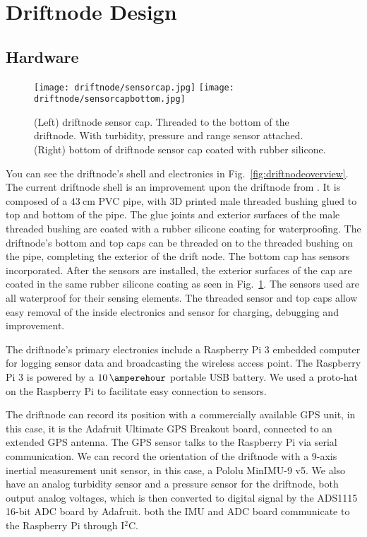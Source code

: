 \section[Design]{Driftnode Design}

\subsection[Hardware]{Hardware}

\begin{figure}[h]
	\begin{center}
	\texttt{[image: driftnode/sensorcap.jpg]}
	\texttt{[image: driftnode/sensorcapbottom.jpg]}
	\caption[Driftnode]{
		(Left) driftnode sensor cap. Threaded to the bottom of the driftnode. With turbidity, pressure and range sensor attached.
		(Right) bottom of driftnode sensor cap coated with rubber silicone.
	} \label{fig:sensorcap}
	\end{center}
	\vspace{-1em}
\end{figure}

You can see the driftnode's shell and electronics in Fig.~\ref{fig:driftnodeoverview}.
The current driftnode shell is an improvement upon the driftnode from \cite{drifterUSC}.
It is composed of a $\SI{43}{\centi\metre}$ PVC pipe, with 3D printed male threaded bushing glued to top and bottom of the pipe.
The glue joints and exterior surfaces of the male threaded bushing are coated with a rubber silicone coating for waterproofing.
The driftnode's bottom and top caps can be threaded on to the threaded bushing on the pipe, completing the exterior of the drift node.
The bottom cap has sensors incorporated.
After the sensors are installed, the exterior surfaces of the cap are coated in the same rubber silicone coating as seen in Fig.~\ref{fig:sensorcap}.
The sensors used are all waterproof for their sensing elements.
The threaded sensor and top caps allow easy removal of the inside electronics and sensor for charging, debugging and improvement.

The driftnode's primary electronics include a Raspberry Pi 3 embedded computer for logging sensor data and broadcasting the wireless access point.
The Raspberry Pi 3 is powered by a $\SI{10}{\amperehour}$ portable USB battery.
We used a proto-hat on the Raspberry Pi to facilitate easy connection to sensors.

The driftnode can record its position with a commercially available GPS unit, in this case, it is the Adafruit Ultimate GPS Breakout board, connected to an extended GPS antenna.
The GPS sensor talks to the Raspberry Pi via serial communication.
We can record the orientation of the driftnode with a 9-axis inertial measurement unit sensor, in this case, a Pololu MinIMU-9 v5.
We also have an analog turbidity sensor and a pressure sensor for the driftnode, both output analog voltages, which is then converted to digital signal by the ADS1115 16-bit ADC board by Adafruit.
both the IMU and ADC board communicate to the Raspberry Pi through I$^{2}$C.

